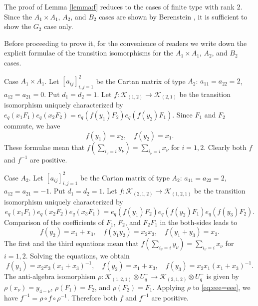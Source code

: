 \documentclass[12pt,a4paper]{article}
\newcommand\K{{\mathcal K}}
\theoremstyle{plain} %
\theoremstyle{definition} %
\theoremstyle{definition} %
\numberwithin{theorem}{section}
\numberwithin{equation}{section}
\numberwithin{figure}{section}
\numberwithin{table}{section}
\newcommand\lemmaref[1]{Lemma \ref{#1}}
\begin{document}
The proof of \lemmaref{lemma:f} reduces to 
the cases of finite type with rank $2$.
Since the $A_1\times A_1$, $A_2$, and $B_2$ cases 
are shown by Berenstein \cite{B9605016}, 
it is sufficient to show the $G_2$ case only.

Before proceeding to prove it, 
for the convenience of readers
we write down the explicit formulae of the transition isomorphisms
for the $A_1\times A_1$, $A_2$, and $B_2$ cases.

Case $A_1\times A_1$.
Let $[a_{ij}]_{i,j=1}^2$ be the Cartan matrix of type $A_2$:
$a_{11}=a_{22}=2$, $a_{12}=a_{21}=0$.
Put $d_1 = d_2 = 1$. 
Let $f:\K_{(1,2)}\to\K_{(2,1)}$ be 
the transition isomorphism uniquely characterized by
$e_q(x_1F_1)e_q(x_2F_2)= e_q(f(y_1)F_2)e_q(f(y_2)F_1)$.
Since $F_1$ and $F_2$ commute, we have
\begin{equation*}
 f(y_1) = x_2, \quad f(y_2) = x_1.
\end{equation*}
These formulae mean 
that $f(\sum_{i_\nu=i} y_\nu)=\sum_{i_\nu=i}x_\nu$ for $i=1,2$.
Clearly both $f$ and $f^{-1}$ are positive.

Case $A_2$.
Let $[a_{ij}]_{i,j=1}^2$ be the Cartan matrix of type $A_2$:
$a_{11}=a_{22}=2$, $a_{12}=a_{21}=-1$.
Put $d_1 = d_2 = 1$. 
Let $f:\K_{(2,1,2)}\to \K_{(1,2,1)}$ be
the transition isomorphism uniquely characterized by
\begin{equation}
\label{eq:eee=eee}
 e_q(x_1F_1)   e_q(x_2F_2)   e_q(x_3F_1)=
 e_q(f(y_1)F_2)e_q(f(y_2)F_1)e_q(f(y_3)F_2).
\end{equation}
Comparison of the coefficients of $F_1$, $F_2$, and $F_2F_1$ in the both-sides
leads to
\begin{equation*}
 f(y_2) = x_1+x_3, \quad
 f(y_1y_2) = x_2x_3, \quad
 f(y_1+y_3) = x_2.
\end{equation*}
The first and the third equations mean
that $f(\sum_{i_\nu=i} y_\nu)=\sum_{i_\nu=i}x_\nu$ for $i=1,2$.
Solving the equations, we obtain
\begin{equation*}
 f(y_1) = x_2x_3(x_1+x_3)^{-1}, \quad
 f(y_2) = x_1+x_3, \quad
 f(y_3) = x_2x_1(x_1+x_3)^{-1}.
\end{equation*}
The anti-algebra isomorphism 
$\rho:\K_{(1,2,1)}\otimes U_q^-\to\K_{(2,1,2)}\otimes U_q^-$
is given by $\rho(x_\nu)=y_{4-\nu}$, 
$\rho(F_1)=F_2$, and $\rho(F_2)=F_1$.
Applying $\rho$ to \eqref{eq:eee=eee}, 
we have $f^{-1}=\rho\circ f\circ\rho^{-1}$.
Therefore both $f$ and $f^{-1}$ are positive.
\end{document}
